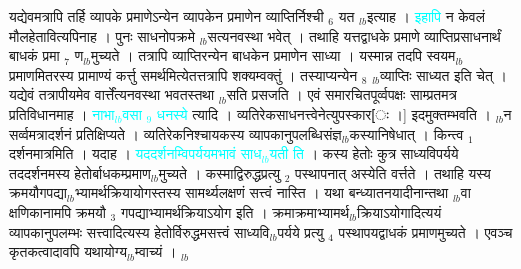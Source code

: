 \documentclass[article,12pt,a4paper]{memoir}%
\newcommand{\quotelemma}[1]{\textcolor{cyan}{#1}}
\newcounter{parCount}
\begin{document}
	  
	  \pstart \leavevmode%
	यद्येवमत्रापि तर्हि व्यापके प्रमाणेऽन्येन व्यापकेन प्रमाणेन व्याप्तिर्निश्ची {\tiny $_{6}$} यत {\tiny $_{lb}$}इत्याह । \quotelemma{इहापि} \cite[1b9]{vn-msN} न केवलं मौलहेतावित्यपिनाह । पुनः साधनोपक्रमे {\tiny $_{lb}$}सत्यनवस्था भवेत् । तथाहि यत्तद्वाधके प्रमाणे व्याप्तिप्रसाधनार्थं बाधकं प्रमा {\tiny $_{7}$} ण{\tiny $_{lb}$}मुच्यते । तत्रापि व्याप्तिरन्येन बाधकेन प्रमाणेन साध्या । यस्मान्न तदपि स्वयम{\tiny $_{lb}$}प्रमाणमितरस्य प्रामाण्यं कर्त्तु समर्थमित्येतत्तत्रापि शक्यम्वक्तुं । तस्याप्यन्येन {\tiny $_{8}$} {\tiny $_{lb}$}व्याप्तिः साध्यत इति चेत् । यद्येवं तत्रापीयमेव वार्त्तेंत्यनवस्था भवतस्तथा {\tiny $_{lb}$}सति प्रसजति । एवं समारचितपूर्व्वपक्षः साम्प्रतमत्र प्रतिविधानमाह । \quotelemma{नाभा{\tiny $_{lb}$}वसा {\tiny $_{9}$} \leavevmode\ledsidenote{\textenglish{8b/msK}} धनस्ये} \cite[1b10]{vn-msN} त्यादि । व्यतिरेकसाधनत्त्वेनेत्युपस्कार[ः ।] इदमुक्तम्भवति । {\tiny $_{lb}$}न सर्व्वमत्रादर्शनं प्रतिक्षिप्यते । व्यतिरेकनिश्चायकस्य व्यापकानुपलब्धिसंज्ञ{\tiny $_{lb}$}कस्यानिषेधात् । किन्त्व {\tiny $_{1}$} दर्शनमात्रमिति । यदाह । \quotelemma{यददर्शनम्विपर्ययमभावं साध{\tiny $_{lb}$}यती} \cite[1b10]{vn-msN} \quotelemma{ति} । कस्य हेतोः कुत्र साध्यविपर्यये तददर्शनमस्य हेतोर्बाधकम्प्रमाण{\tiny $_{lb}$}मुच्यते । कस्माद्विरुद्धप्रत्यु {\tiny $_{2}$} पस्थापनात् अस्येति वर्त्तते । तथाहि यस्य क्रमयौगपद्या{\tiny $_{lb}$}भ्यामर्थक्रियायोगस्तस्य सामर्थ्यलक्षणं सत्त्वं नास्ति । यथा बन्ध्यातनयादीनान्तथा {\tiny $_{lb}$}वा क्षणिकानामपि क्रमयौ {\tiny $_{3}$} गपद्याभ्यामर्थक्रियाऽयोग इति । क्रमाक्रमाभ्यामर्थ{\tiny $_{lb}$}क्रियाऽयोगादित्ययं व्यापकानुपलम्भः सत्त्वादित्यस्य हेतोर्विरुद्धमसत्त्वं साध्यवि{\tiny $_{lb}$}पर्यये प्रत्यु {\tiny $_{4}$} पस्थापयद्वाधकं प्रमाणमुच्यते । एवञ्च कृतकत्वादावपि यथायोग्य{\tiny $_{lb}$}म्वाच्यं ।
	{}
	\pend%
      {\tiny $_{lb}$}
\end{document}
